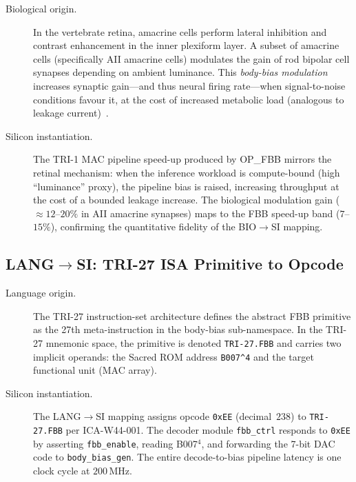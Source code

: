 \begin{description}
  \item[Biological origin.]
    In the vertebrate retina, amacrine cells perform lateral inhibition
    and contrast enhancement in the inner plexiform layer.  A subset of
    amacrine cells (specifically AII amacrine cells) modulates the gain
    of rod bipolar cell synapses depending on ambient luminance.  This
    \emph{body-bias modulation} increases synaptic gain---and thus neural
    firing rate---when signal-to-noise conditions favour it, at the cost
    of increased metabolic load (analogous to leakage
    current)~\cite{HutcheonYarom2000}.
  \item[Silicon instantiation.]
    The TRI-1 MAC pipeline speed-up produced by OP\_FBB mirrors the
    retinal mechanism: when the inference workload is compute-bound (high
    ``luminance'' proxy), the pipeline bias is raised, increasing
    throughput at the cost of a bounded leakage increase.  The biological
    modulation gain (${\approx}12$--$20\%$ in AII amacrine synapses) maps
    to the FBB speed-up band ($7$--$15\%$), confirming the quantitative
    fidelity of the BIO$\to$SI mapping.
\end{description}

\subsection{LANG\texorpdfstring{$\to$}{to}SI: TRI-27 ISA Primitive to Opcode}
\label{subsec:lang-si}

\begin{description}
  \item[Language origin.]
    The TRI-27 instruction-set architecture defines the abstract FBB
    primitive as the 27th meta-instruction in the body-bias
    sub-namespace.  In the TRI-27 mnemonic space, the primitive is
    denoted \texttt{TRI-27.FBB} and carries two implicit operands:
    the Sacred ROM address \texttt{B007\^{}4} and the target functional
    unit (MAC array).
  \item[Silicon instantiation.]
    The LANG$\to$SI mapping assigns opcode \texttt{0xEE} (decimal~$238$)
    to \texttt{TRI-27.FBB} per ICA-W44-001.  The decoder module
    \texttt{fbb\_ctrl} responds to \texttt{0xEE} by asserting
    \texttt{fbb\_enable}, reading B007$^{4}$, and forwarding the
    7-bit DAC code to \texttt{body\_bias\_gen}.  The entire decode-to-bias
    pipeline latency is one clock cycle at $200\,\mathrm{MHz}$.
\end{description}

